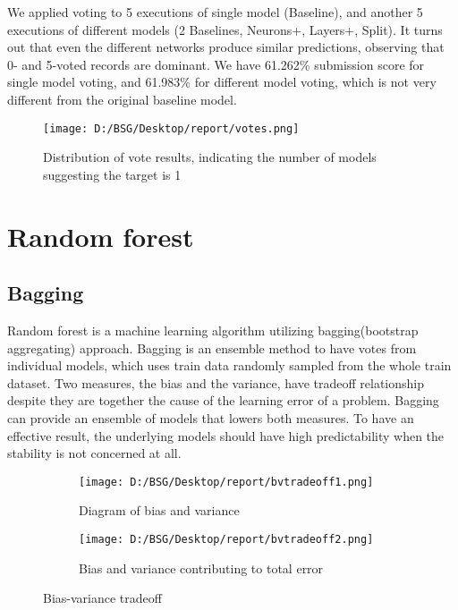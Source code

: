 \documentclass{article}
\begin{document}
We applied voting to 5 executions of single model (Baseline), and another 5
executions of different models (2 Baselines, Neurons+, Layers+, Split).
It turns out that even the different networks produce similar predictions,
observing that 0- and 5-voted records are dominant. We have 61.262\% submission
score for single model voting, and 61.983\% for different model voting, which is not very different from the original baseline model.
\begin{figure}[!h]
  \centering
  \texttt{[image: D:/BSG/Desktop/report/votes.png]}
  \caption{Distribution of vote results, indicating the number of models
  suggesting the target is 1}
  \label{fig:nnvote}
\end{figure}

\section{Random forest}
\subsection{Bagging}
Random forest is a machine learning algorithm utilizing bagging(bootstrap
aggregating) approach. Bagging is an ensemble method to have votes from
individual models, which uses train data randomly sampled from the whole
train dataset. Two measures, the bias and the variance, have tradeoff
relationship despite they are together the cause of the learning error of a
problem. Bagging can provide an ensemble of models that lowers both measures. To
have an effective result, the underlying models should have high predictability
when the stability is not concerned at all.

\begin{figure}[!h]
  \centering
\begin{subfigure}[h]{.38\textwidth}
  \centering
  \texttt{[image: D:/BSG/Desktop/report/bvtradeoff1.png]}
  \caption{Diagram of bias and variance\cite[Fig.1]{WEBSITE:bvtradeoff}}
\end{subfigure}
\begin{subfigure}[h]{.60\textwidth}
  \centering
  \texttt{[image: D:/BSG/Desktop/report/bvtradeoff2.png]}
  \caption{Bias and variance contributing to total error\cite[Fig.6]{WEBSITE:bvtradeoff}}
\end{subfigure}
  \caption{Bias-variance tradeoff\cite{WEBSITE:bvtradeoff}}
  \label{fig:bvtradeoff}
\end{figure}
\end{document}
